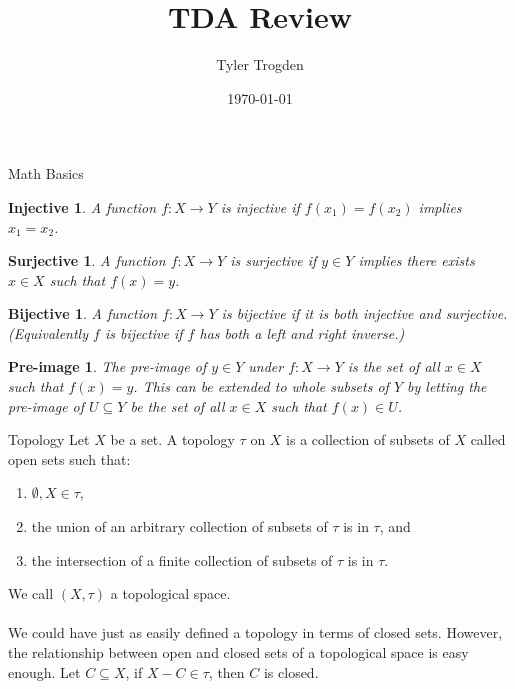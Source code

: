 \documentclass[pdf]{beamer}
\title{TDA Review}
\institute{Brigham Young University}
\author{Tyler Trogden}
\date{\today}
\begin{document}
    \begin{frame}
        \titlepage
    \end{frame}

    \begin{frame}{Math Basics}
        \newtheorem{defn:inj}{Injective}
        \newtheorem{defn:surj}{Surjective}
        \newtheorem{defn:bi}{Bijective}
        \newtheorem{defn:preim}{Pre-image}

        \begin{defn:inj}
            A function $f: X \to Y$ is injective if $f(x_1) = f(x_2)$ implies $x_1 = x_2$.
        \end{defn:inj}
        \begin{defn:surj}
            A function $f: X \to Y$ is surjective if $y \in Y$ implies there exists $x \in X$ such that $f(x) = y$.
        \end{defn:surj}
        \begin{defn:bi}
            A function $f: X \to Y$ is bijective if it is both injective and surjective.
            (Equivalently $f$ is bijective if $f$ has both a left and right inverse.)
        \end{defn:bi}
        \begin{defn:preim}
            The pre-image of $y \in Y$ under $f: X \to Y$ is the set of all $x \in X$ such
            that $f(x) = y$. This can be extended to whole subsets of $Y$ by letting the
            pre-image of $U \subseteq Y$ be the set of all $x \in X$ such that $f(x) \in U$.
        \end{defn:preim}

    \end{frame}

    \begin{frame}{Topology}
        Let $X$ be a set. A {\color{red} topology} $\tau$ on $X$ is a collection of subsets of $X$
        called open sets such that:

        \begin{enumerate}
            \item $\emptyset, X \in \tau$,
            \item the union of an arbitrary collection of subsets of $\tau$ is in $\tau$, and
            \item the intersection of a finite collection of subsets of $\tau$ is in $\tau$.
        \end{enumerate}

        We call $(X, \tau)$ a topological space. \\~\\

        We could have just as easily defined a topology in terms of closed sets. However, the 
        relationship between open and closed sets of a topological space is easy enough. Let 
        $C \subseteq X$, if $X - C \in \tau$, then $C$ is closed.

    \end{frame}
\end{document}
